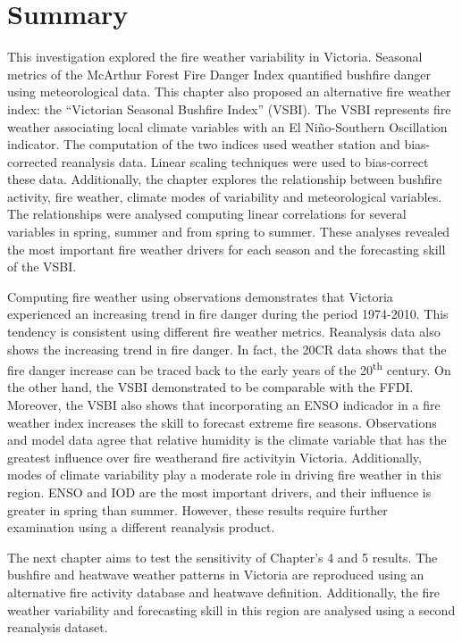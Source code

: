 \section{Summary}

This investigation explored the fire weather variability in Victoria.
Seasonal metrics of the McArthur Forest Fire Danger Index quantified
bushfire danger using meteorological data. This chapter also proposed
an alternative fire weather index: the \textquotedblleft Victorian
Seasonal Bushfire Index\textquotedblright{} (VSBI). The VSBI represents
fire weather associating local climate variables with an El Ni\~no-Southern
Oscillation indicator. The computation of the two indices used weather
station and bias-corrected reanalysis data. Linear scaling techniques
were used to bias-correct these data. Additionally, the chapter explores
the relationship between bushfire activity, fire weather, climate
modes of variability and meteorological variables. The relationships
were analysed computing linear correlations for several variables
in spring, summer and from spring to summer. These analyses revealed
the most important fire weather drivers for each season and the forecasting
skill of the VSBI.

Computing fire weather using observations demonstrates that Victoria
experienced an increasing trend in fire danger during the period 1974-2010.
This tendency is consistent using different fire weather metrics.
Reanalysis data also shows the increasing trend in fire danger. In
fact, the 20CR data shows that the fire danger increase can be traced
back to the early years of the 20\textsuperscript{th} century. On
the other hand, the VSBI demonstrated to be comparable with the FFDI.
Moreover, the VSBI also shows that incorporating an ENSO indicador
in a fire weather index increases the skill to forecast extreme fire
seasons. Observations and model data agree that relative humidity
is the climate variable that has the greatest influence over fire
weather\textemdash and fire activity\textemdash in Victoria. Additionally,
modes of climate variability play a moderate role in driving fire
weather in this region. ENSO and IOD are the most important drivers,
and their influence is greater in spring than summer. However, these
results require further examination using a different reanalysis product.

The next chapter aims to test the sensitivity of Chapter's 4 and 5
results. The bushfire and heatwave weather patterns in Victoria are
reproduced using an alternative fire activity database and heatwave
definition. Additionally, the fire weather variability and forecasting
skill in this region are analysed using a second reanalysis dataset. 
